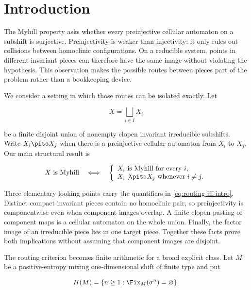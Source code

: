 \section{Introduction}
\label{sec:introduction}

The Myhill property asks whether every preinjective cellular automaton on a
subshift is surjective.  Preinjectivity is weaker than injectivity: it only
rules out collisions between homoclinic configurations.  On a reducible
system, points in different invariant pieces can therefore have the same
image without violating the hypothesis.  This observation makes the possible
routes between pieces part of the problem rather than a bookkeeping device.

We consider a setting in which those routes can be isolated exactly.  Let

\begin{equation}
  X=\bigsqcup_{i\in I}X_i
  \label{eq:clopen-union-intro}
\end{equation}

be a finite disjoint union of nonempty clopen invariant irreducible
subshifts.  Write $X_i\pito X_j$ when there is a preinjective cellular
automaton from $X_i$ to $X_j$.  Our main structural result is

\begin{equation}
  X\text{ is Myhill}
  \quad\Longleftrightarrow\quad
  \left\{
  \begin{array}{l}
    X_i\text{ is Myhill for every }i,\\
    X_i\not\pito X_j\text{ whenever }i\ne j.
  \end{array}
  \right.
  \label{eq:routing-iff-intro}
\end{equation}

Three elementary-looking points carry the quantifiers in
\eqref{eq:routing-iff-intro}.  Distinct compact invariant pieces contain no
homoclinic pair, so preinjectivity is componentwise even when component images
overlap.  A finite clopen pasting of component maps is a cellular automaton on
the whole union.  Finally, the factor image of an irreducible piece lies in one
target piece.  Together these facts prove both implications without assuming
that component images are disjoint.

The routing criterion becomes finite arithmetic for a broad explicit class.
Let $M$ be a positive-entropy mixing one-dimensional shift of finite type and
put

\begin{equation}
  H(M)=\{n\geq 1:\Fix_M(\sigma^n)=\varnothing\}.
  \label{eq:holes-intro}
\end{equation}

